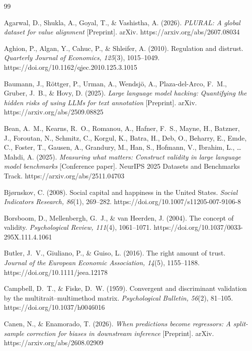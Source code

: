 \documentclass[10pt,letterpaper]{article}
\begin{document}
\begin{thebibliography}{99}\small

 Agarwal, D., Shukla, A., Goyal, T., \& Vashistha, A. (2026). \textit{PLURAL: A global dataset for value alignment} [Preprint]. arXiv. https://arxiv.org/abs/2607.08034

 Aghion, P., Algan, Y., Cahuc, P., \& Shleifer, A. (2010). Regulation and distrust. \textit{Quarterly Journal of Economics, 125}(3), 1015--1049. https://doi.org/10.1162/qjec.2010.125.3.1015

 Baumann, J., R\"ottger, P., Urman, A., Wendsj\"o, A., Plaza-del-Arco, F.~M., Gruber, J.~B., \& Hovy, D. (2025). \textit{Large language model hacking: Quantifying the hidden risks of using LLMs for text annotation} [Preprint]. arXiv. https://arxiv.org/abs/2509.08825

 Bean, A.~M., Kearns, R.~O., Romanou, A., Hafner, F.~S., Mayne, H., Batzner, J., Foroutan, N., Schmitz, C., Korgul, K., Batra, H., Deb, O., Beharry, E., Emde, C., Foster, T., Gausen, A., Grandury, M., Han, S., Hofmann, V., Ibrahim, L., \ldots{} Mahdi, A. (2025). \textit{Measuring what matters: Construct validity in large language model benchmarks} [Conference paper]. NeurIPS 2025 Datasets and Benchmarks Track. https://arxiv.org/abs/2511.04703

 Bj\o rnskov, C. (2008). Social capital and happiness in the United States. \textit{Social Indicators Research, 86}(1), 269--282. https://doi.org/10.1007/s11205-007-9106-8

 Borsboom, D., Mellenbergh, G.~J., \& van Heerden, J. (2004). The concept of validity. \textit{Psychological Review, 111}(4), 1061--1071. https://doi.org/10.1037/0033-295X.111.4.1061

 Butler, J.~V., Giuliano, P., \& Guiso, L. (2016). The right amount of trust. \textit{Journal of the European Economic Association, 14}(5), 1155--1188. https://doi.org/10.1111/jeea.12178

 Campbell, D.~T., \& Fiske, D.~W. (1959). Convergent and discriminant validation by the multitrait--multimethod matrix. \textit{Psychological Bulletin, 56}(2), 81--105. https://doi.org/10.1037/h0046016

 Canen, N., \& Enamorado, T. (2026). \textit{When predictions become regressors: A split-sample correction for biases in downstream inference} [Preprint]. arXiv. https://arxiv.org/abs/2608.02909


\end{thebibliography}
\end{document}
